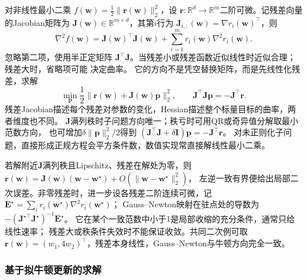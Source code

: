 对非线性最小二乘
$f(\bm{w})=\frac12\lVert\bm{r}(\bm{w})\rVert_2^2$，设
$\bm{r}:\mathbb{R}^d\to\mathbb{R}^m$二阶可微。记残差向量的Jacobian矩阵为
$\bm{J}(\bm{w})\in\mathbb{R}^{m\times d}$，其第$i$行为
$\bm{J}_{i,:}(\bm{w})=\nabla r_i(\bm{w})^{\top}$，则
\[
  \nabla^2f(\bm{w})
  =\bm{J}(\bm{w})^{\top}\bm{J}(\bm{w})
  +\sum_{i=1}^m r_i(\bm{w})\nabla^2r_i(\bm{w}).
\]
忽略第二项，使用半正定矩阵
$\bm{J}^{\top}\bm{J}$。当残差小或残差函数近似线性时近似合理；残差大时，省略项可能
决定曲率。
它的方向不是凭空替换矩阵，而是先线性化残差，求解
\[
 \min_{\bm p}\frac12\|\bm r(\bm w)+\bm J(\bm w)\bm p\|_2^2,
 \qquad
 \bm J^\top\bm J\bm p=-\bm J^\top\bm r.
\]
残差Jacobian描述每个残差对参数的变化，Hessian描述整个标量目标的曲率，两者维度也不同。
$\bm J$满列秩时子问题方向唯一；秩亏时可用QR或奇异值分解取最小范数方向，
也可增加$\delta\|\bm p\|_2^2/2$得到
$(\bm J^\top\bm J+\delta\bm I)\bm p=-\bm J^\top\bm r$。
对未正则化子问题，直接形成正规方程会平方条件数，数值实现常直接解线性最小二乘。

若解附近$\bm J$满列秩且Lipschitz、残差在解处为零，则
$\bm r(\bm w)=\bm J(\bm w)(\bm w-\bm w^\star)+O(\|\bm w-\bm w^\star\|_2^2)$，
左逆一致有界便给出局部二次误差。非零残差时，进一步设各残差二阶连续可微，记
$\bm E^\star=\sum_i r_i(\bm w^\star)\nabla^2r_i(\bm w^\star)$；
Gauss--Newton映射在驻点处的导数为
$-(\bm J^{\star\top}\bm J^\star)^{-1}\bm E^\star$。
它在某个一致范数中小于$1$是局部收缩的充分条件，通常只给线性速率；
残差大或秩条件失效时不能保证收敛。共同二次例可取
$\bm r(\bm w)=(w_1,4w_2)^\top$，残差本身线性，Gauss--Newton与牛顿方向完全一致。

\subsubsection{基于拟牛顿更新的求解}
\label{sec:opt-quasi-newton}

